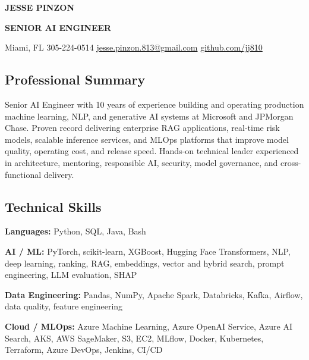 \documentclass[10pt,letterpaper]{article}
\newcommand{\resumesubtitle}{Senior AI Engineer}
\renewcommand{\maketitle}{%
  \begin{center}
    {\fontsize{20.5}{20.5}\bfseries\color{ResumeName}\MakeUppercase{Jesse
Pinzon}\par}
    {\fontsize{11.5}{12.075}\bfseries\color{ResumeTitle}\MakeUppercase{\resumesubtitle}\par}
    \vspace{2pt}
  \end{center}
}
\begin{document}
\maketitle

\begin{center}
{\fontsize{9.5}{10.26}\selectfont\color{ResumeContact} Miami, FL \textbar{} 305-224-0514 \textbar{} \href{mailto:jesse.pinzon.813@gmail.com}{jesse.pinzon.813@gmail.com} \textbar{} \href{https://github.com/jj810}{github.com/jj810}\par}
\vspace{5pt}
\end{center}

\subsection{Professional Summary}\label{professional-summary}

\fontsize{10}{11.1}\selectfont\color{ResumeBody}\setlength{\parskip}{3pt}

Senior AI Engineer with 10 years of experience building and operating
production machine learning, NLP, and generative AI systems at Microsoft
and JPMorgan Chase. Proven record delivering enterprise RAG
applications, real-time risk models, scalable inference services, and
MLOps platforms that improve model quality, operating cost, and release
speed. Hands-on technical leader experienced in architecture, mentoring,
responsible AI, security, model governance, and cross-functional
delivery.

\subsection{Technical Skills}\label{technical-skills}

\fontsize{9.5}{10.4}\selectfont\color{ResumeBody}\setlength{\parskip}{1.25pt}

\textbf{Languages:} Python, SQL, Java, Bash

\textbf{AI / ML:} PyTorch, scikit-learn, XGBoost, Hugging Face
Transformers, NLP, deep learning, ranking, RAG, embeddings, vector and
hybrid search, prompt engineering, LLM evaluation, SHAP

\textbf{Data Engineering:} Pandas, NumPy, Apache Spark, Databricks,
Kafka, Airflow, data quality, feature engineering

\textbf{Cloud / MLOps:} Azure Machine Learning, Azure OpenAI Service,
Azure AI Search, AKS, AWS SageMaker, S3, EC2, MLflow, Docker,
Kubernetes, Terraform, Azure DevOps, Jenkins, CI/CD
\end{document}
